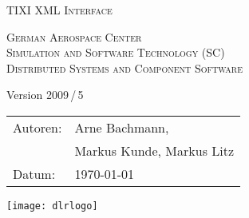 \begin{titlepage}
\pagestyle{empty}

\begin{minipage}[h]{50mm}
\vspace{-10mm}
\hspace{-17mm}
\end{minipage}
%
\begin{minipage}[h]{80mm}
\vspace{-10mm}
\hspace{70mm}
\end{minipage}

   \begin{center}
       \vspace*{2cm}
       \Huge
       \textsc{TIXI XML Interface}

       \vspace{0.5cm}
       \Large
       \textsc{German Aerospace Center\\\vspace{0.3cm}\small{Simulation and Software Technology (SC)\\Distributed Systems and Component Software}}

       \vspace{0.5cm}
       \large
       Version 2009\,/\,5

       \vspace{0.5cm}
       \vspace{1cm}
       \textsc{}
       \vspace{1cm}

      

       \vspace{1cm}
       \Large
       \textsc{}
         \end{center}   
        
   \vfill
   \normalsize
   \begin{tabular}{ll}
       Autoren: & Arne Bachmann, \\
       & Markus Kunde, Markus Litz\\
       Datum:   & \today\\
   \end{tabular}

\begin{minipage}[h]{80mm}
\vspace{-15mm}
\hspace{90mm}
\texttt{[image: dlrlogo]}
\end{minipage}

\end{titlepage}
